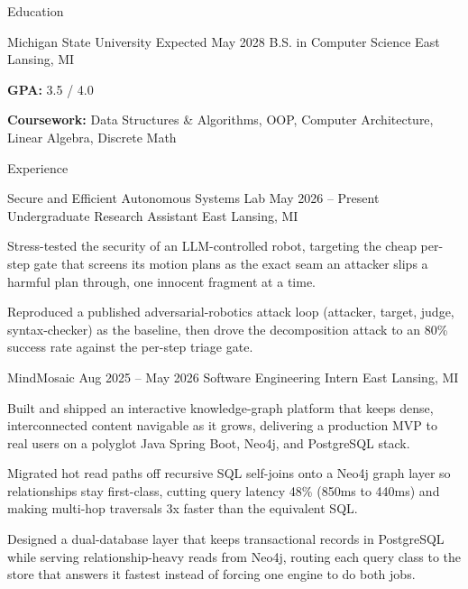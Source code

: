\documentclass[
	11pt
]{../../../template}
\begin{document}
	\begin{rSection}{E}{ducation}
		\begin{rSectionEntry}
			{Michigan State University}
			{Expected May 2028}
			{B.S. in Computer Science}
			{}
			{East Lansing, MI}

			\item \textbf{GPA:} 3.5 / 4.0
			\item \textbf{Coursework:} Data Structures \& Algorithms, OOP, Computer Architecture, Linear Algebra, Discrete Math
		\end{rSectionEntry}
	\end{rSection}

	\begin{rSection}{E}{xperience}
		\begin{rSectionEntry}
			{Secure and Efficient Autonomous Systems Lab}
			{May 2026 -- Present}
			{Undergraduate Research Assistant}
			{}
			{East Lansing, MI}

			\item Stress-tested the security of an LLM-controlled robot, targeting the cheap per-step gate that screens its motion plans as the exact seam an attacker slips a harmful plan through, one innocent fragment at a time.
			\item Reproduced a published adversarial-robotics attack loop (attacker, target, judge, syntax-checker) as the baseline, then drove the decomposition attack to an 80\% success rate against the per-step triage gate.
		\end{rSectionEntry}

		\begin{rSectionEntry}
			{MindMosaic}
			{Aug 2025 -- May 2026}
			{Software Engineering Intern}
			{}
			{East Lansing, MI}

			\item Built and shipped an interactive knowledge-graph platform that keeps dense, interconnected content navigable as it grows, delivering a production MVP to real users on a polyglot Java Spring Boot, Neo4j, and PostgreSQL stack.
			\item Migrated hot read paths off recursive SQL self-joins onto a Neo4j graph layer so relationships stay first-class, cutting query latency 48\% (850ms to 440ms) and making multi-hop traversals 3x faster than the equivalent SQL.
			\item Designed a dual-database layer that keeps transactional records in PostgreSQL while serving relationship-heavy reads from Neo4j, routing each query class to the store that answers it fastest instead of forcing one engine to do both jobs.
		\end{rSectionEntry}

	\end{rSection}
\end{document}
